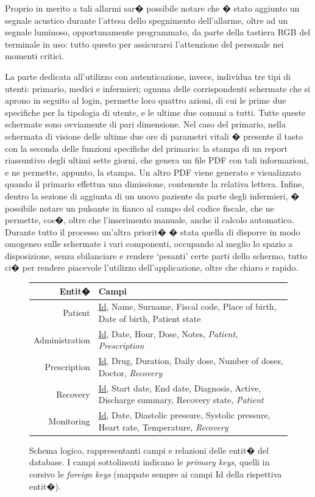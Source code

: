 \documentclass[final, smallexted]{svjour3}
\begin{document}
 Proprio in merito a tali allarmi sar� possibile notare che � stato aggiunto un segnale acustico durante l'attesa dello spegnimento dell'allarme, oltre ad un segnale luminoso, opportunamente programmato, da parte della tastiera RGB del terminale in uso: tutto questo per assicurarsi l'attenzione del personale nei momenti critici.
 
 La parte dedicata all'utilizzo con autenticazione, invece, individua tre tipi di utenti: primario, medici e infermieri; ognuna delle corrispondenti schermate che si aprono in seguito al login, permette loro quattro azioni, di cui le prime due specifiche per la tipologia di utente, e le ultime due comuni a tutti. Tutte queste schermate sono ovviamente di pari dimensione.
 Nel caso del primario, nella schermata di visione delle ultime due ore di parametri vitali � presente il tasto con la seconda delle funzioni specifiche del primario: la stampa di un report riassuntivo degli ultimi sette giorni, che genera un file PDF con tali informazioni, e ne permette, appunto, la stampa.
 Un altro PDF viene generato e visualizzato quando il primario effettua una dimissione, contenente la relativa lettera.
 Infine, dentro la sezione di aggiunta di un nuovo paziente da parte degli infermieri, � possibile notare un pulsante in fianco al campo del codice fiscale, che ne permette, cos�, oltre che l'inserimento manuale, anche il calcolo automatico.
 Durante tutto il processo un'altra priorit� � stata quella di disporre in modo omogeneo sulle schermate i vari componenti, occupando al meglio lo spazio a disposizione, senza sbilanciare e rendere `pesanti' certe parti dello schermo, tutto ci� per rendere piacevole l'utilizzo dell'applicazione, oltre che chiaro e rapido.

 
 \begin{figure}[b]
 	
 	\begin{tabular}{r | l}
 		Entit� & Campi \\ \hline
 		Patient & \underline{Id}, Name, Surname, Fiscal code, Place of birth, Date of birth, Patient state \\
 		Administration & \underline{Id}, Date, Hour, Dose, Notes, \textit{Patient}, \textit{Prescription} \\
 		Prescription & \underline{Id}, Drug, Duration, Daily dose, Number of doses, Doctor, \textit{Recovery} \\ 
 		Recovery & \underline{Id}, Start date, End date, Diagnosis, Active, Discharge summary, Recovery state, \textit{Patient}\\
 		Monitoring & \underline{Id}, Date, Diastolic pressure, Systolic pressure, Heart rate, Temperature, \textit{Recovery}
 	\end{tabular}\caption{Schema logico, rappresentanti campi e relazioni delle entit� del database. I campi sottolineati indicano le \textit{primary keys}, quelli in corsivo le \textit{foreign keys} (mappate sempre ai campi Id della rispettiva entit�).}\label{entitiesTable}
 	
 \end{figure}
\end{document}
